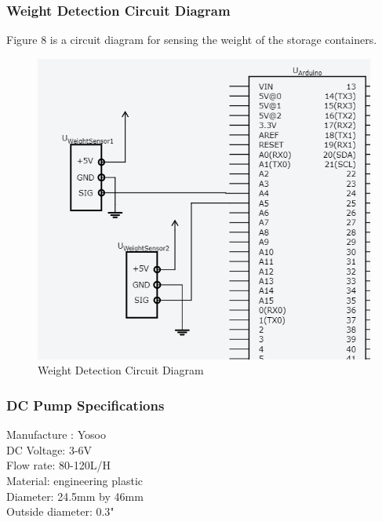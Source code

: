 \documentclass [10pt]{article}
\begin{document}

\subsubsection{Weight Detection Circuit Diagram}
Figure 8 is a circuit diagram for sensing the weight of the storage containers.
\begin{figure} [h!]
	\centering
	\includegraphics [scale = 0.5] {Figures/WeightSensors.png}
	\caption{Weight Detection Circuit Diagram}
\end{figure}


\subsubsection{DC Pump Specifications}
Manufacture : Yosoo \\
DC Voltage: 3-6V\\
Flow rate: 80-120L/H\\
Material: engineering plastic\\
Diameter: 24.5mm by 46mm \\
Outside diameter:  0.3" 

\end{document}
